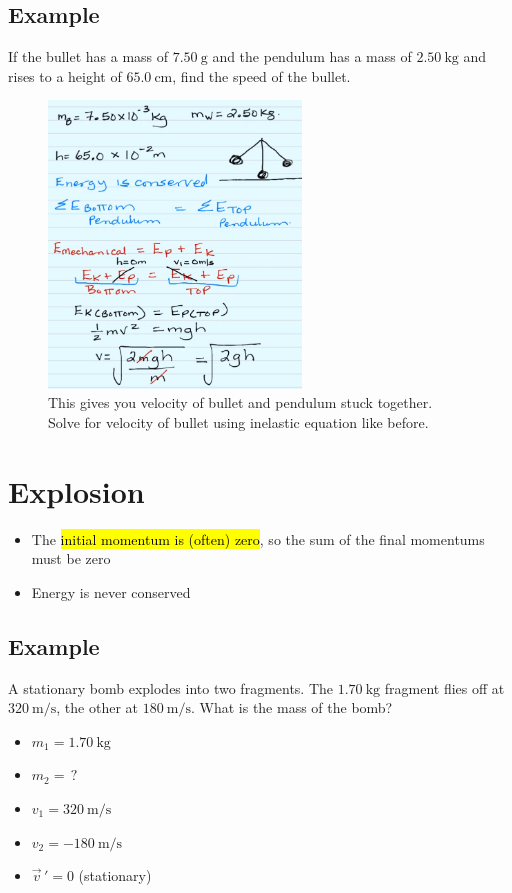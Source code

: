 \documentclass[a4paper,12pt]{article}
\begin{document}
\subsection{Example}
If the bullet has a mass of $\SI{7.50}{\g}$ and the pendulum has a mass of $\SI{2.50}{\kg}$ and rises to a height of $\SI{65.0}{\cm}$, find the speed of the bullet.

\begin{figure}[H]
    \centering
    \includegraphics[width=0.6\textwidth]{q-pend-1a}
    \caption{This gives you velocity of bullet and pendulum stuck together. \\Solve for velocity of bullet using inelastic equation like before.}
\end{figure}

\section{Explosion}
\begin{itemize}
    \item{The \hl{initial momentum is (often) zero}, so the sum of the final momentums must be zero}
    \item{Energy is never conserved}
\end{itemize}

\subsection{Example}
A stationary bomb explodes into two fragments. The $\SI{1.70}{\kg}$ fragment flies off at $\SI{320}{\m/\s}$, the other at $\SI{180}{\m/\s}$. What is the mass of the bomb?

\begin{itemize}
    \item{$m_1 = \SI{1.70}{\kg}$}
    \item{$m_2 = \,?$}
    \item{$v_1 = \SI{320}{\m/\s}$}
    \item{$v_2 = \SI{-180}{\m/\s}$}
    \item{$\vec{v}\,' = 0$ (stationary)}
\end{itemize}
\end{document}
